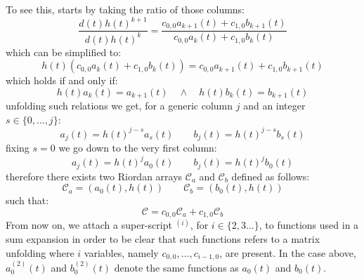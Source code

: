To see this, starts by taking the ratio of those columns:
\begin{displaymath} 
    \frac{d(t)h(t)^{k+1}}{d(t)h(t)^{k}} = \frac{c_{0,0}a_{k+1}(t) + c_{1,0}b_{k+1}(t)}
        {c_{0,0}a_{k}(t) + c_{1,0}b_{k}(t)}
\end{displaymath} 
which can be simplified to:
\begin{displaymath} 
    h(t)\left(c_{0,0}a_{k}(t) + c_{1,0}b_{k}(t)\right) = 
        c_{0,0}a_{k+1}(t) + c_{1,0}b_{k+1}(t)
\end{displaymath} 
which holds if and only if:
\begin{displaymath} 
    h(t) a_{k}(t) = a_{k+1}(t) \quad \wedge \quad h(t) b_{k}(t) = b_{k+1}(t)
\end{displaymath} 
unfolding such relations we get, for a generic column $j$ and an integer $s\in\lbrace 0,\ldots,j\rbrace$:
\begin{displaymath} 
    a_{j}(t) = h(t)^{j-s} a_{s}(t) \quad \quad 
    b_{j}(t) = h(t)^{j-s} b_{s}(t)
\end{displaymath} 
fixing $s=0$ we go down to the very first column:
\begin{displaymath} 
    a_{j}(t) = h(t)^{j} a_{0}(t) \quad \quad 
    b_{j}(t) = h(t)^{j} b_{0}(t)
\end{displaymath} 
therefore there exists two Riordan arrays $\mathcal{C}_{a}$ and $\mathcal{C}_{b}$
defined as follows:
\begin{displaymath} 
    \mathcal{C}_{a} = \left(a_{0}(t), h(t)\right) \quad \quad 
    \mathcal{C}_{b} = \left(b_{0}(t), h(t)\right) \quad \quad 
\end{displaymath} 
such that:
\begin{equation} 
    \mathcal{C} = c_{0,0}\mathcal{C}_{a} + c_{1,0}\mathcal{C}_{b}
    \label{eq:two:splitted:catalan:riordan:expansion}
\end{equation} 
From now on, we attach a super-script $^{(i)}$, for $i\in\lbrace 2,3\ldots\rbrace$, 
to functions used in a sum expansion in order to be clear that such functions 
refers to a matrix unfolding where $i$ variables, namely $c_{0,0},\ldots,c_{i-1,0}$, 
are present. In the case above, $a_{0}^{(2)}(t)$ and $b_{0}^{(2)}(t)$ 
denote the same functions as $a_{0}(t)$ and $b_{0}(t)$.


